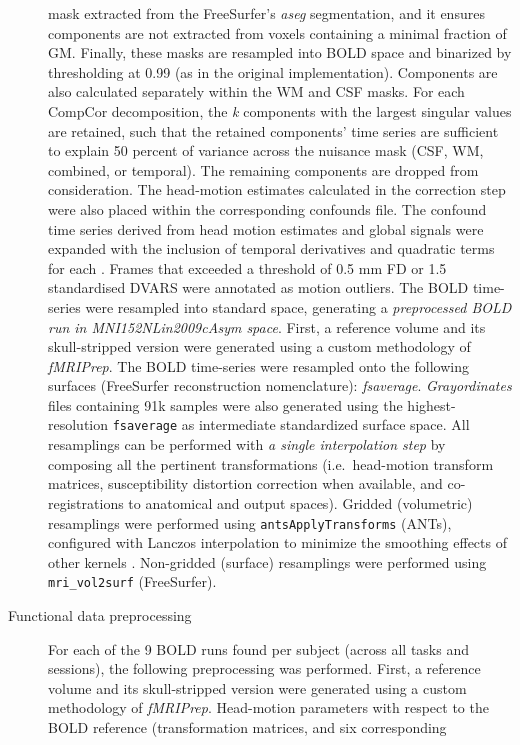 \documentclass[
]{article}
\begin{document}
\begin{description}
mask extracted from the FreeSurfer's \emph{aseg} segmentation, and it
ensures components are not extracted from voxels containing a minimal
fraction of GM. Finally, these masks are resampled into BOLD space and
binarized by thresholding at 0.99 (as in the original implementation).
Components are also calculated separately within the WM and CSF masks.
For each CompCor decomposition, the \emph{k} components with the largest
singular values are retained, such that the retained components' time
series are sufficient to explain 50 percent of variance across the
nuisance mask (CSF, WM, combined, or temporal). The remaining components
are dropped from consideration. The head-motion estimates calculated in
the correction step were also placed within the corresponding confounds
file. The confound time series derived from head motion estimates and
global signals were expanded with the inclusion of temporal derivatives
and quadratic terms for each \citep{confounds_satterthwaite_2013}.
Frames that exceeded a threshold of 0.5 mm FD or 1.5 standardised DVARS
were annotated as motion outliers. The BOLD time-series were resampled
into standard space, generating a \emph{preprocessed BOLD run in
MNI152NLin2009cAsym space}. First, a reference volume and its
skull-stripped version were generated using a custom methodology of
\emph{fMRIPrep}. The BOLD time-series were resampled onto the following
surfaces (FreeSurfer reconstruction nomenclature): \emph{fsaverage}.
\emph{Grayordinates} files \citep{hcppipelines} containing 91k samples
were also generated using the highest-resolution \texttt{fsaverage} as
intermediate standardized surface space. All resamplings can be
performed with \emph{a single interpolation step} by composing all the
pertinent transformations (i.e.~head-motion transform matrices,
susceptibility distortion correction when available, and
co-registrations to anatomical and output spaces). Gridded (volumetric)
resamplings were performed using \texttt{antsApplyTransforms} (ANTs),
configured with Lanczos interpolation to minimize the smoothing effects
of other kernels \citep{lanczos}. Non-gridded (surface) resamplings were
performed using \texttt{mri\_vol2surf} (FreeSurfer).
\item[Functional data preprocessing]
For each of the 9 BOLD runs found per subject (across all tasks and
sessions), the following preprocessing was performed. First, a reference
volume and its skull-stripped version were generated using a custom
methodology of \emph{fMRIPrep}. Head-motion parameters with respect to
the BOLD reference (transformation matrices, and six corresponding

\end{description}
\end{document}
